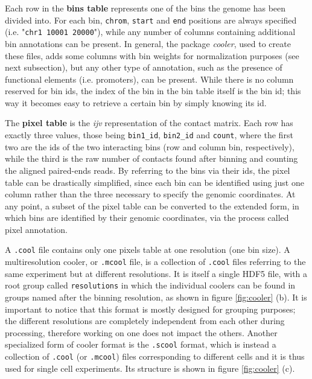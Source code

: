 Each row in the \textbf{bins table} represents one of the bins the genome has been divided into. For each bin, \texttt{chrom}, \texttt{start} and \texttt{end} positions are always specified (i.e. "\texttt{chr1  10001  20000}"), while any number of columns containing additional bin annotations can be present. In general, the package \emph{cooler}, used to create these files, adds some columns with bin weights for normalization purposes (see next subsection), but any other type of annotation, such as the presence of functional elements (i.e. promoters), can be present. While there is no column reserved for bin ids, the index of the bin in the bin table itself is the bin id; this way it becomes easy to retrieve a certain bin by simply knowing its id.

The \textbf{pixel table} is the \emph{ijv} representation of the contact matrix. Each row has exactly three values, those being \texttt{bin1\_id}, \texttt{bin2\_id} and \texttt{count}, where the first two are the ids of the two interacting bins (row and column bin, respectively), while the third is the raw number of contacts found after binning and counting the aligned paired-ends reads. By referring to the bins via their ids, the pixel table can be drastically simplified, since each bin can be identified using just one column rather than the three necessary to specify the genomic coordinates. At any point, a subset of the pixel table can be converted to the extended form, in which bins are identified by their genomic coordinates, via the process called pixel annotation.

A \texttt{.cool} file contains only one pixels table at one resolution (one bin size). A multiresolution cooler, or \texttt{.mcool} file, is a collection of \texttt{.cool} files referring to the same experiment but at different resolutions. It is itself a single HDF5 file, with a root group called \texttt{resolutions} in which the individual coolers can be found in groups named after the binning resolution, as shown in figure \ref{fig:cooler} (b). It is important to notice that this format is mostly designed for grouping purposes; the different resolutions are completely independent from each other during processing, therefore working on one does not impact the others. Another specialized form of cooler format is the \texttt{.scool} format, which is instead a collection of \texttt{.cool} (or \texttt{.mcool}) files corresponding to different cells and it is thus used for single cell experiments. Its structure is shown in figure \ref{fig:cooler} (c).

